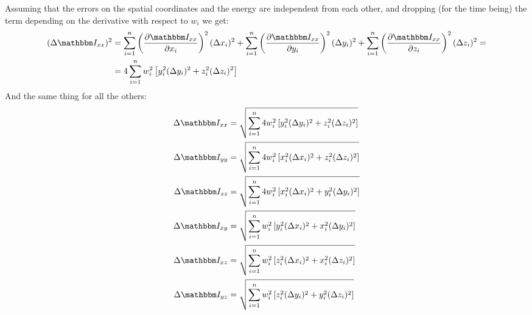 \documentclass[a4paper,11pt]{article}
\newcommand{\pder}[2]{\frac{\partial#1}{\partial#2}}
\newcommand{\itm}{\mathbbm I}
\newcommand{\itc}[1]{\itm_{#1}}
\begin{document}
Assuming that the errors on the spatial coordinates and the energy are
independent from each other, and dropping (for the time being) the term
depending on the derivative with respect to $w_i$ we get:
\begin{align*}
(\Delta \itc{xx})^2 &=
\sum_{i=1}^n \left( \pder{\itc{xx}}{x_i} \right)^2(\Delta x_i)^2 +
\sum_{i=1}^n \left( \pder{\itc{xx}}{y_i} \right)^2(\Delta y_i)^2 +
\sum_{i=1}^n \left( \pder{\itc{xx}}{z_i} \right)^2(\Delta z_i)^2 =\\
&= 4\sum_{i=1}^n w_i^2\left[y_i^2(\Delta y_i)^2 + z_i^2(\Delta z_i)^2\right]
\end{align*}
And the same thing for all the others:
\begin{align}
\Delta \itc{xx} &= \sqrt{
  \sum_{i=1}^n 4w_i^2\left[y_i^2(\Delta y_i)^2 + z_i^2(\Delta z_i)^2\right]
}\\
\Delta \itc{yy} &= \sqrt{
  \sum_{i=1}^n 4w_i^2\left[x_i^2(\Delta x_i)^2 + z_i^2(\Delta z_i)^2\right]
}\\
\Delta \itc{zz} &= \sqrt{
  \sum_{i=1}^n 4w_i^2\left[x_i^2(\Delta x_i)^2 + y_i^2(\Delta y_i)^2\right]
}\\
\Delta \itc{xy} &= \sqrt{
  \sum_{i=1}^n w_i^2\left[y_i^2(\Delta x_i)^2 + x_i^2(\Delta y_i)^2\right]
}\\
\Delta \itc{xz} &= \sqrt{
  \sum_{i=1}^n w_i^2\left[z_i^2(\Delta x_i)^2 + x_i^2(\Delta z_i)^2\right]
}\\
\Delta \itc{yz} &= \sqrt{
  \sum_{i=1}^n w_i^2\left[z_i^2(\Delta y_i)^2 + y_i^2(\Delta z_i)^2\right]
}
\end{align}
\end{document}
